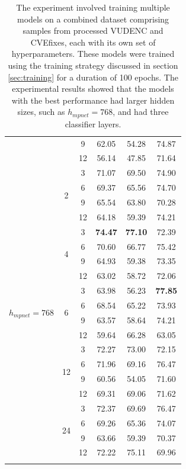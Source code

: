 \documentclass{ieeeaccess}
\begin{document}
\begin{table}[h]
\begin{tabular}{cccccc}
    &    & 9  &62.05 & 54.28 &74.87\\
    &    &\rowcolor{gray!15}  12 &56.14 & 47.85 &71.64\\
\hline
\multirow{20}{*}{$h_{mpnet}=768$} 
    & \multirow{4}{*}{2} & 3  &71.07 & 69.50 &74.90\\
    &    &\rowcolor{gray!15}  6  &69.37 & 65.56 &74.70 \\
    &    & 9  &65.54 & 63.80 &70.28 \\
    &    &\rowcolor{gray!15}  12 &64.18 & 59.39 &74.21 \\
\cline{2-6}
    & \multirow{4}{*}{4}  & 3  &\textbf{74.47} & \textbf{77.10} &72.39\\
    &    &\rowcolor{gray!15}  6  &70.60 & 66.77 &75.42\\
    &    & 9  &64.93 & 59.38 &73.35\\
    &    &\rowcolor{gray!15}  12 &63.02 & 58.72 &72.06\\
\cline{2-6}    
    & \multirow{4}{*}{6}  & 3  &63.98 & 56.23 &\textbf{77.85}\\
    &    &\rowcolor{gray!15}  6  &68.54 & 65.22 &73.93 \\
    &    & 9  &63.57 & 58.64 &74.21 \\
    &    &\rowcolor{gray!15}  12 &59.64 & 66.28 &63.05 \\
\cline{2-6}    
    & \multirow{4}{*}{12} & 3  &72.27 & 73.00 &72.15\\
    &    &\rowcolor{gray!15}  6  &71.96 & 69.16 &76.47\\
    &    & 9  &60.56 & 54.05 &71.60\\
    &    &\rowcolor{gray!15}  12 &69.31 & 69.06 &71.62\\
\cline{2-6}
    & \multirow{4}{*}{24} & 3  &72.37 & 69.69 &76.47\\
    &    &\rowcolor{gray!15}  6  &69.26 & 65.36 &74.07\\
    &    & 9  &63.66 & 59.39 &70.37\\
    &    &\rowcolor{gray!15}  12 &72.22 & 75.11 &69.96\\
\Xhline{2\arrayrulewidth}
\bottomrule
\end{tabular}
\label{table:hyperparam_result}

\caption{The experiment involved training multiple models on a combined dataset comprising samples from processed VUDENC and CVEfixes, each with its own set of hyperparameters. These models were trained using the training strategy discussed in section \ref{sec:training} for a duration of 100 epochs. The experimental results showed that the models with the best performance had larger hidden sizes, such as $h_{mpnet}=768$, and had three classifier layers. }
\end{table}
\end{document}
